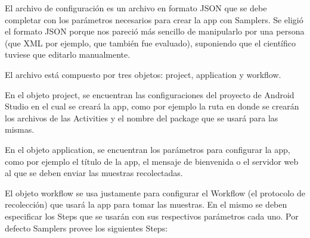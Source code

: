 El archivo de configuración es un archivo en formato JSON que se debe completar con los parámetros necesarios para crear la app con Samplers. Se eligió el formato JSON porque nos pareció más sencillo de manipularlo por una persona (que XML por ejemplo, que también fue evaluado), suponiendo que el científico tuviese que editarlo manualmente.

El archivo está compuesto por tres objetos: project, application y workflow.

En el objeto project, se encuentran las configuraciones del proyecto de Android Studio en el cual se creará la app, como por ejemplo la ruta en donde se crearán los archivos de las Activities y el nombre del package que se usará para las mismas. 

En el objeto application, se encuentran los parámetros para configurar la app, como por ejemplo el título de la app, el mensaje de bienvenida o el servidor web al que se deben enviar las muestras recolectadas. 

El objeto workflow se usa justamente para configurar el Workflow (el protocolo de recolección) que usará la app para tomar las muestras. En el mismo se deben especificar los Steps que se usarán con sus respectivos parámetros cada uno. Por defecto Samplers provee los siguientes Steps:

